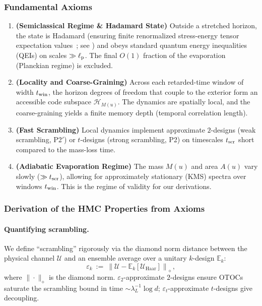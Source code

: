 \documentclass[a4paper,11pt]{article}
\newcommand{\HMC}{\textsc{HMC}\xspace}
\theoremstyle{plain}
\theoremstyle{definition}
\theoremstyle{remark}
\begin{document}
\subsubsection{Fundamental Axioms}
\begin{enumerate}[label=\textbf{Axiom \arabic*}:]
  \item \textbf{(Semiclassical Regime \& Hadamard State)} Outside a stretched horizon, the state is Hadamard (ensuring finite renormalized stress-energy tensor expectation values~\cite{Radzikowski:1996}; see ) and obeys standard quantum energy inequalities (QEIs) on scales \(\gg \ell_{\rm p}\).
The final \(O(1)\) fraction of the evaporation (Planckian regime) is excluded.
  \item \textbf{(Locality and Coarse-Graining)} Across each retarded-time window of width $t_{\rm win}$, the horizon degrees of freedom that couple to the exterior form an accessible code subspace $\mathcal{H}_{M(u)}$. The dynamics are spatially local, and the coarse-graining yields a finite memory depth (temporal correlation length).
  \item \textbf{(Fast Scrambling)} Local dynamics implement approximate \(2\)-designs (weak scrambling, P2$'$) or \(t\)-designs (strong scrambling, P2) on timescales \(t_{\rm scr}\) short compared to the mass-loss time.
  \item \textbf{(Adiabatic Evaporation Regime)} The mass \(M(u)\) and area \(A(u)\) vary slowly (\(\gg t_{\rm scr}\)), allowing for approximately stationary (KMS) spectra over windows \(t_{\rm win}\). This is the regime of validity for our derivations.
\end{enumerate}

\subsubsection{Derivation of the \HMC{} Properties from Axioms}

\paragraph{Quantifying scrambling.}
We define ``scrambling'' rigorously via the diamond norm distance between the physical channel $\mathcal{U}$ and an ensemble average over a unitary $k$-design $\mathbb{E}_k$:
\begin{equation}
\varepsilon_k \ :=\ \left\|\mathcal{U} - \mathbb{E}_k[\mathcal{U}_{\text{Haar}}]\right\|_{\diamond}\,,
\end{equation}
where $\|\cdot\|_{\diamond}$ is the diamond norm. $\varepsilon_2$-approximate $2$-designs ensure OTOCs saturate the scrambling bound in time $\sim \lambda_L^{-1}\log d$; $\varepsilon_t$-approximate $t$-designs give decoupling.
\end{document}
